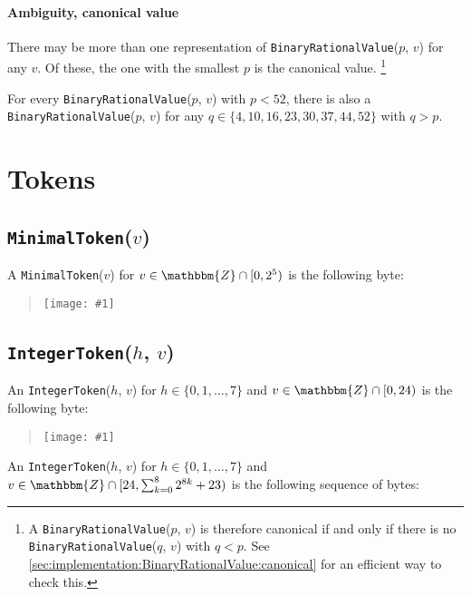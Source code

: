 \documentclass[headings=normal, headsepline, numbers=noenddot, fleqn, a4paper]{scrartcl}
\newcommand{\DborSyntaxIdent}[1]{\texttt{#1}}
\newcommand{\IncludeImageInPlace}[1]{%
    \begin{quotation}%
        \texttt{[image: \#1]}%
    \end{quotation}%
}
\begin{document}
    \paragraph{Ambiguity, canonical value}

    There may be more than one representation of \DborSyntaxIdent{Binary\-Rational\-Value}($p$, $v$) for any $v$.
    Of these, the one with the smallest $p$ is the canonical value.%
    \footnote{
        A \DborSyntaxIdent{BinaryRationalValue}($p$, $v$) is therefore canonical if and only if there is
        no \DborSyntaxIdent{BinaryRationalValue}($q$, $v$) with $q < p$.
        See \ref{sec:implementation:BinaryRationalValue:canonical} for an efficient way to check this.
    }
    
    For every \DborSyntaxIdent{Binary\-Rational\-Value}($p$, $v$) with $p < 52$, there is also
    a \DborSyntaxIdent{Binary\-Rational\-Value}($p$, $v$) for any
    $q \in \{4, 10, 16, 23, 30, 37, 44, 52\}$ with $q > p$.

    
    \section{Tokens}
    \label{sec:tokens}

    \subsection{\DborSyntaxIdent{MinimalToken}($v$)}
    \hypertarget{sec:def:MinimalToken}{}

    A \DborSyntaxIdent{MinimalToken}($v$) for $v \in \mathbbm{Z} \cap [0, 2^5)$ 
    is the following byte:

    \IncludeImageInPlace{MinimalToken.pdf}


    \subsection{\DborSyntaxIdent{IntegerToken}($h$, $v$)}
    \hypertarget{sec:def:IntegerToken}{}

    An \DborSyntaxIdent{IntegerToken}($h$, $v$) for $h \in \{0, 1, \ldots, 7\}$ and
    $v \in \mathbbm{Z} \cap [0, 24)$ is the following byte:

    \IncludeImageInPlace{IntegerTokenA.pdf}
    
    An \DborSyntaxIdent{IntegerToken}($h$, $v$) for $h \in \{0, 1, \ldots, 7\}$ and
    $v \in \mathbbm{Z} \cap [24, \sum_{k = 0}^8 2^{8k} + 23)$
    is the following sequence of bytes:
\end{document}
